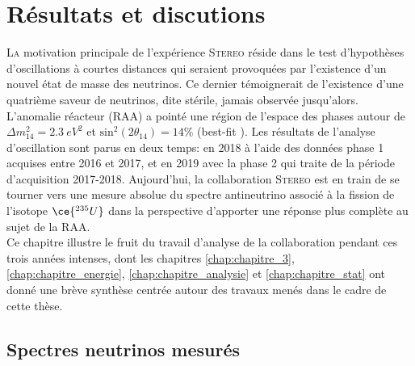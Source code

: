 

\chapter{Résultats et discutions}
\label{chap:chapitre_results}


\minitoc

\newpage

\lettrine{L}{a} motivation principale de l'expérience \textsc{Stereo} réside dans le test d'hypothèses d'oscillations à courtes distances qui seraient provoquées par l'existence d'un nouvel état de masse des neutrinos. Ce dernier témoignerait de l'existence d'une quatrième saveur de neutrinos, dite stérile, jamais observée jusqu'alors. L'anomalie réacteur (RAA) a pointé une région de l'espace des phases autour de $\Delta m_{14}^2 = \SI{2.3}{eV^2}$ et $\textrm{sin}^2(2\theta_{14}) = 14 \%$ (best-fit \cite{Mention:2011rk}). Les résultats de l'analyse d'oscillation sont parus en deux temps: en 2018 à l'aide des données \og phase 1 \fg{} acquises entre 2016 et 2017, et en 2019 avec la \og phase 2 \fg{} qui traite de la période d'acquisition 2017-2018. Aujourd'hui, la collaboration \textsc{Stereo} est en train de se tourner vers une mesure absolue du spectre antineutrino associé à la fission de l'isotope $\ce{^{235}U}$ dans la perspective d'apporter une réponse plus complète au sujet de la RAA.\\

Ce chapitre illustre le fruit du travail d'analyse de la collaboration pendant ces trois années intenses, dont les chapitres \ref{chap:chapitre_3}, \ref{chap:chapitre_energie}, \ref{chap:chapitre_analysie} et \ref{chap:chapitre_stat} ont donné une brève synthèse centrée autour des travaux menés dans le cadre de cette thèse.


\bigbreak

\section{Spectres neutrinos mesurés}

